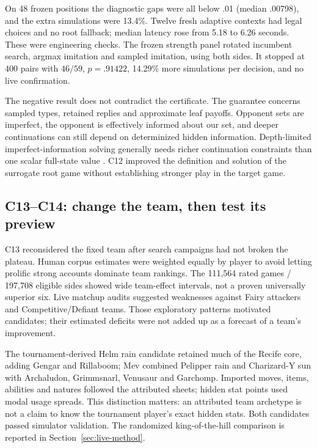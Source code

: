 On 48 frozen positions the diagnostic gaps were all below .01 (median
.00798), and the extra simulations were 13.4\%. Twelve fresh adaptive
contexts had legal choices and no root fallback; median latency rose from
5.18 to 6.26 seconds. These were engineering checks. The frozen strength
panel rotated incumbent search, argmax imitation and sampled imitation,
using both sides. It stopped at 400 pairs with $46/59$, $p=.91422$,
14.29\% more simulations per decision, and no live confirmation.

The negative result does not contradict the certificate. The guarantee
concerns sampled types, retained replies and approximate leaf payoffs.
Opponent sets are imperfect, the opponent is effectively informed about
our set, and deeper continuations can still depend on determinized hidden
information. Depth-limited imperfect-information solving generally needs
richer continuation constraints than one scalar full-state value
\citep{brown2018depth}. C12 improved the definition and solution of the
surrogate root game without establishing stronger play in the target game.


\subsection{C13--C14: change the team, then test its preview}
C13 reconsidered the fixed team after search campaigns had not broken the
plateau. Human corpus estimates were weighted equally by player to avoid
letting prolific strong accounts dominate team rankings. The 111,564 rated
games / 197,708 eligible sides showed wide team-effect intervals, not a
proven universally superior six. Live matchup audits suggested weaknesses
against Fairy attackers and Competitive/Defiant teams. Those exploratory
patterns motivated candidates; their estimated deficits were not added up
as a forecast of a team's improvement.

The tournament-derived Helm rain candidate retained much of the Recife core,
adding Gengar and Rillaboom; Mev combined Pelipper rain and Charizard-Y sun
with Archaludon, Grimmsnarl, Venusaur and Garchomp. Imported moves, items,
abilities and natures followed the attributed sheets; hidden stat points
used modal usage spreads. This distinction matters: an attributed team
archetype is not a claim to know the tournament player's exact hidden stats.
Both candidates passed simulator validation. The randomized king-of-the-hill
comparison is reported in Section~\ref{sec:live-method}.

